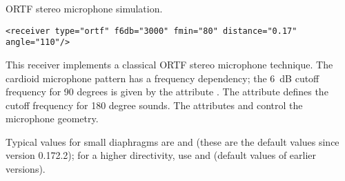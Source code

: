 ORTF stereo microphone simulation.
 
\begin{lstlisting}[numbers=none]
<receiver type="ortf" f6db="3000" fmin="80" distance="0.17" angle="110"/>
\end{lstlisting}

This receiver implements a classical ORTF stereo microphone
technique. The cardioid microphone pattern has a frequency dependency;
the 6~dB cutoff frequency for 90 degrees is given by the attribute
. The attribute  defines the cutoff
frequency for 180 degree sounds. The attributes  and
 control the microphone geometry.

Typical values for small diaphragms are  and
 (these are the default values since version
0.172.2); for a higher directivity, use  and
 (default values of earlier versions).

